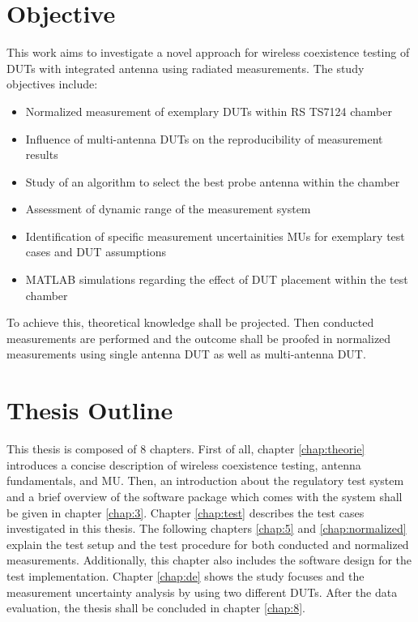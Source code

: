 \section{Objective}
This work aims to investigate a novel approach for wireless coexistence testing of \acsp{DUT} with integrated antenna using radiated measurements. The study objectives include:
\begin{itemize}
\item Normalized measurement of exemplary \acsp{DUT} within \ac{RS} TS7124 chamber
\item Influence of multi-antenna \acsp{DUT} on the reproducibility of measurement results
\item Study of an algorithm to select the best probe antenna within the chamber
\item Assessment of dynamic range of the measurement system
\item Identification of specific measurement uncertainities \acsp{MU} for exemplary test cases and \acs{DUT} assumptions
\item MATLAB simulations regarding the effect of \acs{DUT} placement within the test chamber
\end{itemize}
To achieve this, theoretical knowledge shall be projected. Then conducted measurements are performed and the outcome shall be proofed in normalized measurements using single antenna \acs{DUT} as well as multi-antenna \acs{DUT}. 

\section{Thesis Outline}
This thesis is composed of 8 chapters. First of all, chapter \ref{chap:theorie} introduces a concise description of wireless coexistence testing, antenna fundamentals, and \acf{MU}. Then, an introduction about the regulatory test system and a brief overview of the software package which comes with the system shall be given in chapter \ref{chap:3}. Chapter  \ref{chap:test} describes the test cases investigated in this thesis. The following chapters  \ref{chap:5} and  \ref{chap:normalized} explain the test setup and the test procedure for both conducted and normalized measurements. Additionally, this chapter also includes the software design for the test implementation. Chapter \ref{chap:de} shows the study focuses and the measurement uncertainty analysis by using two different \acsp{DUT}. After the data evaluation, the thesis shall be concluded in chapter \ref{chap:8}. 










